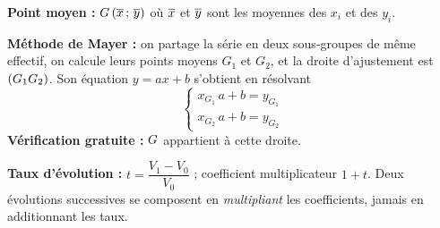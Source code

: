 \textbf{Point moyen :} $G\left(\overline{x}\,;\,\overline{y}\right)$ où $\overline{x}$
et $\overline{y}$ sont les moyennes des $x_{i}$ et des $y_{i}$.

\textbf{Méthode de Mayer :} on partage la série en deux sous-groupes de même
effectif, on calcule leurs points moyens $G_{1}$ et $G_{2}$, et la droite
d'ajustement est $(G_{1}G_{2})$. Son équation $y = ax+b$ s'obtient en
résolvant
\[
  \begin{cases} x_{G_{1}}\,a+b = y_{G_{1}}\\
                x_{G_{2}}\,a+b = y_{G_{2}} \end{cases}
\]
\textbf{Vérification gratuite :} $G$ appartient à cette droite.

\textbf{Taux d'évolution :} $t = \dfrac{V_{1}-V_{0}}{V_{0}}$ ; coefficient
multiplicateur $1+t$. Deux évolutions successives se composent en
\emph{multipliant} les coefficients, jamais en additionnant les taux.
